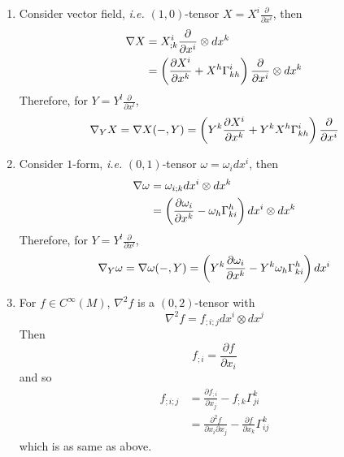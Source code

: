 \begin{exam}
	\begin{enumerate}[label=(\arabic{*})]
		\item Consider vector field, \emph{i.e.} $(1,0)$-tensor $X = X^i \frac{\partial}{\partial x^i}$, then
		\begin{equation*}
			\begin{aligned}
				\nabla X &= X^i_{;k} \frac{\partial}{\partial x^i} \otimes dx^k \\
				&= \left(\frac{\partial X^i}{\partial x^k} + X^h\Gamma^i_{kh}\right)\frac{\partial}{\partial x^i} \otimes dx^k
			\end{aligned}
		\end{equation*}
		Therefore, for $Y = Y^l\frac{\partial}{\partial x^l}$,
		\begin{equation*}
			\nabla_YX = \nabla X(-,Y) = \left(Y^k\frac{\partial X^i}{\partial x^k} + Y^kX^h\Gamma^i_{kh}\right)\frac{\partial}{\partial x^i}
		\end{equation*}
		\item Consider $1$-form, \emph{i.e.} $(0,1)$-tensor $\omega = \omega_i dx^i$, then
		\begin{equation*}
			\begin{aligned}
				\nabla \omega &= \omega_{i;k}dx^i\otimes dx^k \\
				&= \left(\frac{\partial \omega_i}{\partial x^k} - \omega_h\Gamma^h_{ki}\right)dx^i\otimes dx^k
			\end{aligned}
		\end{equation*}
		Therefore, for $Y = Y^l\frac{\partial}{\partial x^l}$,
		\begin{equation*}
			\nabla_Y\omega = \nabla \omega(-,Y) = \left(Y^k\frac{\partial \omega_i}{\partial x^k} - Y^k\omega_h\Gamma^h_{ki}\right)dx^i
		\end{equation*}
		\item For $f \in C^\infty(M)$, $\nabla^2 f$ is a $(0,2)$-tensor with
		\begin{equation*}
			\nabla^2 f = f_{;i;j}dx^i\otimes dx^j
		\end{equation*}
		Then
		\begin{equation*}
			f_{;i} = \frac{\partial f}{\partial x_i}
		\end{equation*}
		and so
		\begin{equation*}
			\begin{aligned}
				f_{;i;j} & = \frac{\partial f_{;i}}{\partial x_j} - f_{;k}\Gamma^k_{ji} \\
				&= \frac{\partial^2 f}{\partial x_i \partial x_j} -  \frac{\partial f}{\partial x_k}\Gamma^k_{ij}
			\end{aligned}
		\end{equation*}
		which is as same as above.
	\end{enumerate}
\end{exam}
